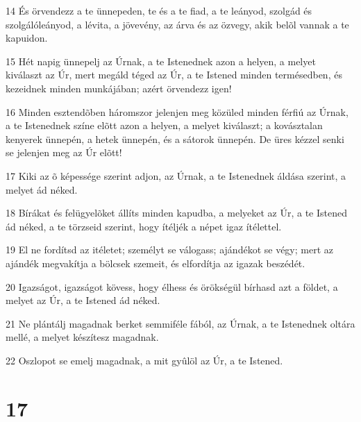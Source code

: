 \par 14 És örvendezz a te ünnepeden, te és a te fiad, a te leányod, szolgád és szolgálóleányod, a lévita, a jövevény, az árva és az özvegy, akik belõl vannak a te kapuidon.
\par 15 Hét napig ünnepelj az Úrnak, a te Istenednek azon a helyen, a melyet kiválaszt az Úr, mert megáld téged az Úr, a te Istened minden termésedben, és kezeidnek minden munkájában; azért  örvendezz igen!
\par 16 Minden esztendõben háromszor jelenjen meg közüled minden férfiú az Úrnak, a te Istenednek színe elõtt azon a helyen, a melyet kiválaszt; a kovásztalan kenyerek ünnepén, a hetek ünnepén, és a sátorok ünnepén. De üres kézzel  senki se jelenjen meg az Úr elõtt!
\par 17 Kiki az õ képessége szerint adjon, az Úrnak, a te Istenednek áldása szerint, a melyet ád néked.
\par 18 Bírákat és felügyelõket állíts minden kapudba, a melyeket az Úr, a te Istened ád néked, a te törzseid szerint, hogy ítéljék a népet igaz ítélettel.
\par 19 El ne fordítsd az itéletet; személyt se válogass; ajándékot  se végy; mert az ajándék megvakítja a bölcsek szemeit, és elfordítja az igazak beszédét.
\par 20 Igazságot, igazságot kövess, hogy élhess és örökségül bírhasd azt a földet, a melyet az Úr, a te Istened ád néked.
\par 21 Ne plántálj magadnak berket semmiféle fából, az Úrnak, a te Istenednek oltára mellé, a melyet készítesz magadnak.
\par 22 Oszlopot se emelj magadnak, a mit gyûlöl az Úr, a te Istened.

\chapter{17}

